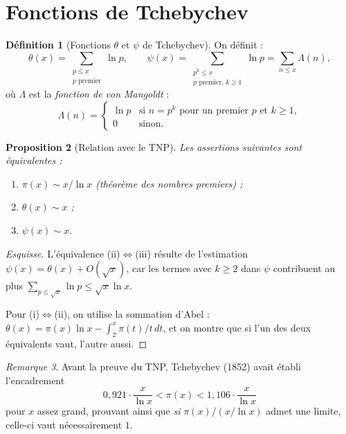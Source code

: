 \documentclass[12pt,a4paper,openany]{book}
\theoremstyle{definition}
\newtheorem{definition}{Définition}[chapter]
\theoremstyle{plain}
\newtheorem{proposition}[definition]{Proposition}
\theoremstyle{remark}
\newtheorem{remarque}[definition]{Remarque}
\begin{document}
\section{Fonctions de Tchebychev}
\label{sec:tchebychev}

\begin{definition}[Fonctions $\theta$ et $\psi$ de Tchebychev]
\label{def:tchebychev}
On définit :
\[
  \theta(x) = \sum_{\substack{p \leq x \\ p \text{ premier}}} \ln p,
  \qquad
  \psi(x) = \sum_{\substack{p^k \leq x \\ p \text{ premier}, \, k \geq 1}} \ln p
  = \sum_{n \leq x} \Lambda(n),
\]
où $\Lambda$ est la \emph{fonction de von Mangoldt} :
\[
  \Lambda(n) = \begin{cases} \ln p & \text{si } n = p^k \text{ pour un premier } p
    \text{ et } k \geq 1, \\ 0 & \text{sinon.} \end{cases}
\]
\end{definition}

\begin{proposition}[Relation avec le TNP]
\label{prop:tchebychev-TNP}
Les assertions suivantes sont équivalentes :
\begin{enumerate}[label=(\roman*)]
  \item $\pi(x) \sim x/\ln x$ \quad (théorème des nombres premiers) ;
  \item $\theta(x) \sim x$ ;
  \item $\psi(x) \sim x$.
\end{enumerate}
\end{proposition}

\begin{proof}[Esquisse]
L'équivalence (ii)$\iff$(iii) résulte de l'estimation $\psi(x) = \theta(x) + O(\sqrt{x})$,
car les termes avec $k \geq 2$ dans $\psi$ contribuent au plus $\sum_{p \leq \sqrt{x}} \ln p
\leq \sqrt{x} \ln x$.

Pour (i)$\iff$(ii), on utilise la sommation d'Abel :
$\theta(x) = \pi(x) \ln x - \int_2^x \pi(t)/t \, dt$, et on montre que si l'un
des deux équivalents vaut, l'autre aussi.
\end{proof}

\begin{remarque}
\label{rem:tchebychev-encadrement}
Avant la preuve du TNP, Tchebychev (1852) avait établi
l'encadrement
\[
  0{,}921 \cdot \frac{x}{\ln x} < \pi(x) < 1{,}106 \cdot \frac{x}{\ln x}
\]
pour $x$ assez grand, prouvant ainsi que \emph{si} $\pi(x)/(x/\ln x)$ admet une
limite, celle-ci vaut nécessairement $1$.
\end{remarque}
\end{document}
